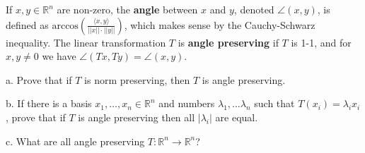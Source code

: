 \begin{exercise}{8}
    If $x, y \in \mathbb{R}^n$ are non-zero, the \textbf{angle} between $x$ and $y$, denoted $\angle (x, y)$, is defined as $\text{arccos}(\frac{\langle x, y \rangle}{\lvert \lvert x \rvert \rvert \cdot \lvert \lvert y \rvert \rvert})$, which makes sense by the Cauchy-Schwarz inequality. The linear transformation $T$ is \textbf{angle preserving} if $T$ is 1-1, and for $x, y \neq 0$ we have $\angle(Tx, Ty) = \angle(x, y)$.

    a. Prove that if $T$ is norm preserving, then $T$ is angle preserving.

    b. If there is a basis $x_1, \ldots, x_n \in \mathbb{R}^n$ and numbers $\lambda_1, \ldots \lambda_n$ such that $T(x_i) = \lambda_i x_i$, prove that if $T$ is angle preserving then all $\lvert \lambda_i \rvert$ are equal.

    c. What are all angle preserving $T: \mathbb{R}^n \rightarrow \mathbb{R}^n$?
\end{exercise}

